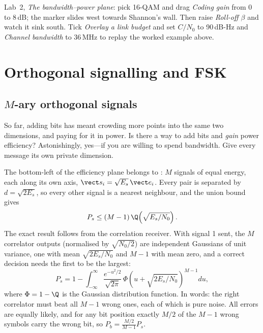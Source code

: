 \begin{tryit}
Lab~2, \emph{The bandwidth--power plane}: pick 16-QAM and drag \emph{Coding gain} from 0 to 8\,dB;
the marker slides west towards Shannon's wall. Then raise \emph{Roll-off $\beta$} and watch it
sink south. Tick \emph{Overlay a link budget} and set \emph{$C/N_0$} to 90\,dB-Hz and
\emph{Channel bandwidth} to 36\,MHz to replay the worked example above.
\end{tryit}

\section{Orthogonal signalling and FSK}
\label{sec:ch09:orthogonal}

\subsection{\texorpdfstring{$M$}{M}-ary orthogonal signals}

So far, adding bits has meant crowding more points into the same two dimensions, and paying
for it in power. Is there a way to add bits and \emph{gain} power efficiency? Astonishingly,
yes---if you are willing to spend bandwidth. Give every message its own private dimension.

The bottom-left of the efficiency plane belongs to : $M$ signals of
equal energy, each along its own axis, $\vect s_i=\sqrt{E_s}\,\vect e_i$. Every pair is separated
by $d=\sqrt{2E_s}$, so every other signal is a nearest neighbour, and the union bound gives
\begin{equation}
P_s\le(M-1)\,\Q\!\left(\sqrt{E_s/N_0}\right).
\end{equation}
The exact result follows from the correlation receiver. With signal 1 sent, the $M$ correlator
outputs (normalised by $\sqrt{N_0/2}$) are independent Gaussians of unit variance, one with mean
$\sqrt{2E_s/N_0}$ and $M-1$ with mean zero, and a correct decision needs the first to be the
largest:
\begin{equation}
P_s=1-\int_{-\infty}^{\infty}\frac{e^{-u^2/2}}{\sqrt{2\pi}}\,
\Phi\!\left(u+\sqrt{2E_s/N_0}\right)^{M-1}du ,
\label{eq:ch09:orth}
\end{equation}
where $\Phi=1-\Q$ is the Gaussian distribution function. In words: the right correlator must beat
all $M-1$ wrong ones, each of which is pure noise. All errors are equally likely, and for any bit
position exactly $M/2$ of the $M-1$ wrong symbols carry the wrong bit, so
$P_b=\frac{M/2}{M-1}P_s$.

